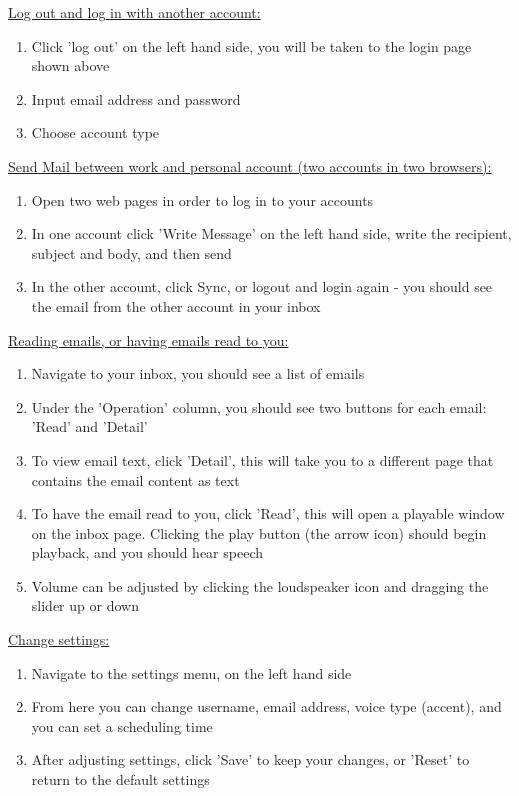 \documentclass{article}
\begin{document}
\noindent \underline{Log out and log in with another account:}
\begin{enumerate}
  \item Click 'log out' on the left hand side, you will be taken to the login page shown above
  \item Input email address and password
  \item Choose account type
\end{enumerate}

\noindent \underline{Send Mail between work and personal account (two accounts in two browsers):}
\begin{enumerate}
  \item Open two web pages in order to log in to your accounts
  \item In one account click 'Write Message' on the left hand side, write the recipient, subject and body, and then send
  \item In the other account, click Sync, or logout and login again - you should see the email from the other account in your inbox
\end{enumerate}

\noindent \underline{Reading emails, or having emails read to you:}
\begin{enumerate}
  \item Navigate to your inbox, you should see a list of emails
  \item Under the 'Operation' column, you should see two buttons for each email: 'Read' and 'Detail'
  \item To view email text, click 'Detail', this will take you to a different page that contains the email content as text
  \item To have the email read to you, click 'Read', this will open a playable window on the inbox page. Clicking the play button (the arrow icon) should begin playback, and you should hear speech
  \item Volume can be adjusted by clicking the loudspeaker icon and dragging the slider up or down
\end{enumerate}

\noindent \underline{Change settings:}
\begin{enumerate}
  \item Navigate to the settings menu, on the left hand side
  \item From here you can change username, email address, voice type (accent), and you can set a scheduling time
  \item After adjusting settings, click 'Save' to keep your changes, or 'Reset' to return to the default settings
\end{enumerate}
\end{document}
